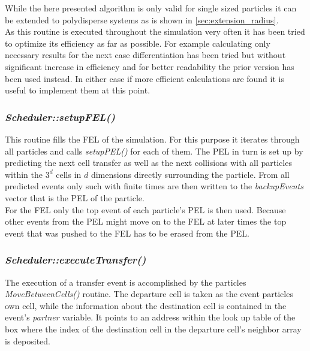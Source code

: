 While the here presented algorithm is only valid for single sized particles it can be extended to polydisperse systems as is shown in \autoref{sec:extension_radius}.\\

As this routine is executed throughout the simulation very often it has been tried to optimize its efficiency as far as possible. For example calculating only necessary results for the next case differentiation has been tried but without significant increase in efficiency and for better readability the prior version has been used instead. In either case if more efficient calculations are found it is useful to implement them at this point.\\   

\subsubsection{\quad \textit{Scheduler::setupFEL()}}
This routine fills the FEL of the simulation. For this purpose it iterates through all particles and calls \textit{setupPEL()} for each of them. The PEL in turn is set up by predicting the next cell transfer as well as the next collisions with all particles within the $3^d$ cells in $d$ dimensions directly surrounding the particle. From all predicted events only such with finite times are then written to the \textit{backupEvents} vector that is the PEL of the particle.\\
For the FEL only the top event of each particle's PEL is then used. Because other events from the PEL might move on to the FEL at later times the top event that was pushed to the FEL has to be erased from the PEL.\\

\subsubsection{\quad \textit{Scheduler::executeTransfer()}}
The execution of a transfer event is accomplished by the particles \textit{MoveBetweenCells()} routine. The departure cell is taken as the event particles own cell, while the information about the destination cell is contained in the event's \textit{partner} variable. It points to an address within the look up table of the box where the index of the destination cell in the departure cell's neighbor array is deposited.\\

